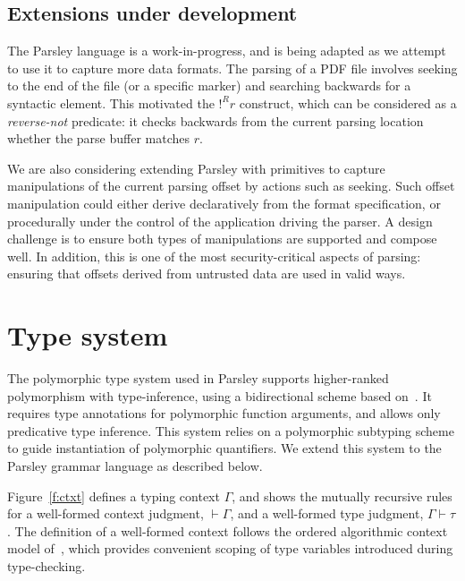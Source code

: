 \documentclass[letterpaper]{article}
\begin{document}
\subsection*{Extensions under development}

The Parsley language is a work-in-progress, and is being adapted as we
attempt to use it to capture more data formats.  The parsing of a PDF
file involves seeking to the end of the file (or a specific marker)
and searching backwards for a syntactic element.  This motivated the
$!^Rr$ construct, which can be considered as a \emph{reverse-not}
predicate: it checks backwards from the current parsing location
whether the parse buffer matches $r$.

We are also considering extending Parsley with primitives to capture
manipulations of the current parsing offset by actions such as
seeking.  Such offset manipulation could either derive declaratively
from the format specification, or procedurally under the control of
the application driving the parser.  A design challenge is to ensure
both types of manipulations are supported and compose well.  In
addition, this is one of the most security-critical aspects of
parsing: ensuring that offsets derived from untrusted data are used in
valid ways.

\section{Type system}
\label{s:typesys}

The polymorphic type system used in Parsley supports higher-ranked
polymorphism with type-inference, using a bidirectional scheme based
on~\cite{Dunfield13:bidir}.  It requires type annotations for
polymorphic function arguments, and allows only predicative type
inference.  This system relies on a polymorphic subtyping scheme
\cite{odersky96} to guide instantiation of polymorphic quantifiers.
We extend this system to the Parsley grammar language as described
below.

Figure~\ref{f:ctxt} defines a typing context $\Gamma$, and shows the
mutually recursive rules for a well-formed context judgment,
$\vdash\Gamma$, and a well-formed type judgment, $\Gamma\vdash\tau$.
The definition of a well-formed context follows the ordered
algorithmic context model
of~\cite{zhao2018,zhao19:bidir,Dunfield13:bidir}, which provides
convenient scoping of type variables introduced during type-checking.
\end{document}
